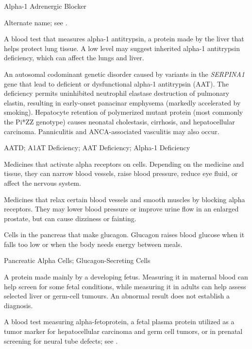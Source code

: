\synonyms
Alpha-1 Adrenergic Blocker

 Alternate name; see .

 A blood test that measures alpha-1 antitrypsin, a protein made by the liver that helps protect lung tissue. A low level may suggest inherited alpha-1 antitrypsin deficiency, which can affect the lungs and liver.

 An autosomal codominant genetic disorder caused by variants in the \textit{SERPINA1} gene that lead to deficient or dysfunctional alpha-1 antitrypsin (AAT). The deficiency permits uninhibited neutrophil elastase destruction of pulmonary elastin, resulting in early-onset panacinar emphysema (markedly accelerated by smoking). Hepatocyte retention of polymerized mutant protein (most commonly the Pi*ZZ genotype) causes neonatal cholestasis, cirrhosis, and hepatocellular carcinoma. Panniculitis and ANCA-associated vasculitis may also occur.

\synonyms
AATD; A1AT Deficiency; AAT Deficiency; Alpha-1 Deficiency

 Medicines that activate alpha receptors on cells. Depending on the medicine and tissue, they can narrow blood vessels, raise blood pressure, reduce eye fluid, or affect the nervous system.

 Medicines that relax certain blood vessels and smooth muscles by blocking alpha receptors. They may lower blood pressure or improve urine flow in an enlarged prostate, but can cause dizziness or fainting.

 Cells in the pancreas that make glucagon. Glucagon raises blood glucose when it falls too low or when the body needs energy between meals.

\synonyms
Pancreatic Alpha Cells; Glucagon-Secreting Cells

 A protein made mainly by a developing fetus. Measuring it in maternal blood can help screen for some fetal conditions, while measuring it in adults can help assess selected liver or germ-cell tumours. An abnormal result does not establish a diagnosis.

 A blood test measuring alpha-fetoprotein, a fetal plasma protein utilized as a tumor marker for hepatocellular carcinoma and germ cell tumors, or in prenatal screening for neural tube defects; see .

